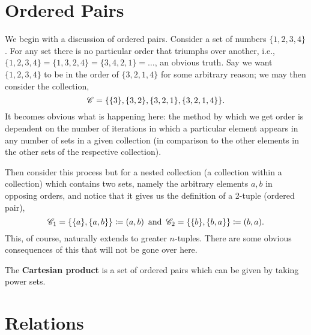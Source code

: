 \documentclass{report}
\begin{document}

\section{Ordered Pairs}
We begin with a discussion of ordered pairs. Consider a set of numbers \( \{1,2,3,4\}   \). For any set there is no particular order that triumphs over another, i.e., \( \{1,2,3,4\} = \{1,3,2,4\} = \{3,4,2,1\} =\ldots     \), an obvious truth. Say we want \( \{1,2,3,4\}   \) to be in the order of \( \{3,2,1,4\}   \) for some arbitrary reason; we may then consider the collection,
\[
  {\mathscr{C}} = \{\{3\} , \{3,2\} ,\{3,2,1\} , \{3,2,1,4\}     \}
.\] 
It becomes obvious what is happening here: the method by which we get order is dependent on the number of iterations in which a particular element appears in any number of sets in a given collection (in comparison to the other elements in the other sets of the respective collection). 

Then consider this process but for a nested collection (a collection within a collection) which contains two sets, namely the arbitrary elements \( a,b \) in opposing orders, and notice that it gives us the definition of a 2-tuple (ordered pair),
\[
  {\mathscr{C}}_{1} = \{\{a\} ,\{a,b\}   \} \coloneqq (a,b) \, \text{ and }\, {\mathscr{C}}_{2}  = \{\{b\} ,\{b,a\}   \} \coloneqq  (b,a)  
.\] 
This, of course, naturally extends to greater \( n \)-tuples. There are some obvious consequences of this that will not be gone over here. 

The \textbf{Cartesian product} is a set of ordered pairs which can be given by taking power sets. 



\section{Relations}
\end{document}
